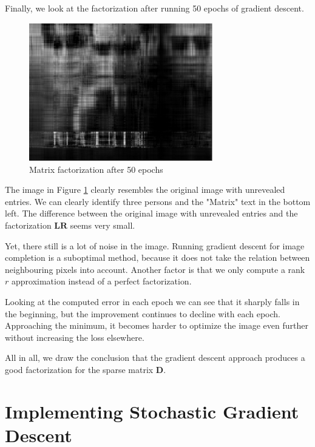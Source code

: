 \documentclass{support/acm_proc_article-sp}
\begin{document}
    Finally, we look at the factorization after running 50 epochs of gradient descent.
    \begin{figure}[htbp]
        \centering
        \includegraphics[width=8cm]{images/gradient-50.png}
        \caption{Matrix factorization after 50 epochs}
        \label{fig:gradient-50}
    \end{figure}
    The image in Figure \ref{fig:gradient-50} clearly resembles the original image with unrevealed entries.
    We can clearly identify three persons and the "Matrix" text in the bottom left.
    The difference between the original image with unrevealed entries and the factorization $\mathbf{LR}$ seems
    very small.

    Yet, there still is a lot of noise in the image.
    Running gradient descent for image completion is a suboptimal method, because it does not take the relation between
    neighbouring pixels into account.
    Another factor is that we only compute a rank $r$ approximation instead of a perfect factorization.

    Looking at the computed error in each epoch we can see that it sharply falls in the beginning, but the improvement
    continues to decline with each epoch.
    Approaching the minimum, it becomes harder to optimize the image even further without increasing the loss elsewhere.

    All in all, we draw the conclusion that the gradient descent approach produces a good factorization for the sparse
    matrix $\mathbf{D}$.


    \section{Implementing Stochastic Gradient Descent}
\end{document}
